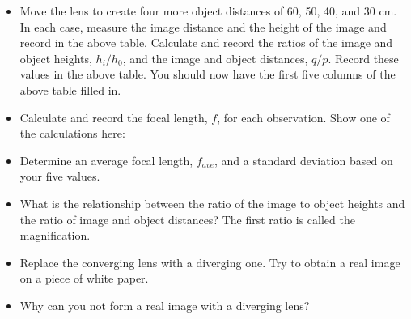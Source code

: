 \begin{itemize}
\item Move the lens to create four more object distances of 60, 50, 40, and 30 cm. In each case, measure the image distance and the height of the image and record in the above table. Calculate and record the ratios of the image and object heights, $h_i / h_0$, and the image and object distances, $q / p$. Record these values in the above table. You should now have the first five columns of the above table filled in.
\item Calculate and record the focal length, $f$, for each observation. Show one of the calculations here:\vspace{15mm}
\item Determine an average focal length, $f_{ave}$, and a standard deviation based on your five values.
\vspace{15mm}
\item What is the relationship between the ratio of the image to object
heights and the ratio of image and object distances? The first ratio
is called the magnification.\vspace{15mm}

\item Replace the converging lens with a diverging one. Try to obtain a
real image on a piece of white paper.
\item Why can you not form a real image with a diverging lens?\vspace{15mm}

\end{itemize}





